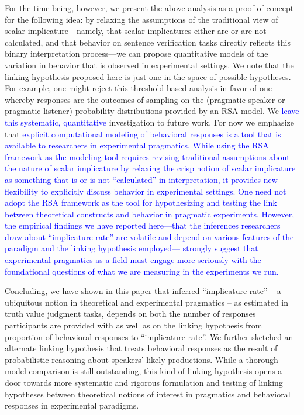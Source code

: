 \documentclass[man]{apa6}
\newcommand{\change}[1]{\textcolor{Blue}{#1}}
\theoremstyle{definition}
\theoremstyle{definition}
\theoremstyle{definition}
\theoremstyle{remark}
\begin{document}
For the time being, however, we present the above analysis as a proof of
concept for the following idea: by relaxing the assumptions of the
traditional view of scalar implicature---namely, that scalar implicatures
either are or are not calculated, and that behavior on sentence
verification tasks directly reflects this binary interpretation
process---we can propose quantitative models of the variation in
behavior that is observed in experimental settings. We note that the linking
hypothesis proposed here is just one in the space of possible hypotheses. For
example, one might reject this threshold-based analysis in favor of one
whereby responses are the outcomes of sampling on the (pragmatic speaker
or pragmatic listener) probability distributions provided by an RSA
model. We \change{leave this systematic, quantitative} investigation to future work. For now we
emphasize that \change{explicit computational modeling of behavioral responses is a tool that is  available to researchers in experimental
pragmatics. While using the RSA framework as the modeling tool requires revising traditional assumptions about the nature of scalar
implicature by relaxing the crisp notion of scalar
implicature as something that is or is not \enquote{calculated} in
interpretation, it provides new flexibility to explicitly discuss
 behavior in experimental settings. One need not adopt the RSA framework as the tool for hypothesizing and testing the link between theoretical constructs and behavior in pragmatic experiments. However, the empirical findings we have reported here---that the inferences researchers draw about ``implicature rate'' are volatile and depend on various features of the paradigm and the linking hypothesis employed--- strongly suggest that experimental pragmatics  as a field must engage more seriously with the foundational questions of what we are measuring in the experiments we run.}

Concluding, we have shown in this paper that inferred
\enquote{implicature rate} -- a ubiquitous notion in theoretical and experimental
pragmatics -- as estimated in truth value judgment tasks, depends on
both the number of responses participants are provided with as well as
on the linking hypothesis from proportion of behavioral responses to
\enquote{implicature rate}. We further sketched an alternate linking
hypothesis that treats behavioral responses as the result of
probabilistic reasoning about speakers' likely productions. While a
thorough model comparison is still outstanding, this kind of linking
hypothesis opens a door towards more systematic and rigorous formulation
and testing of linking hypotheses between theoretical notions of
interest in pragmatics and behavioral responses in experimental
paradigms.
\end{document}
